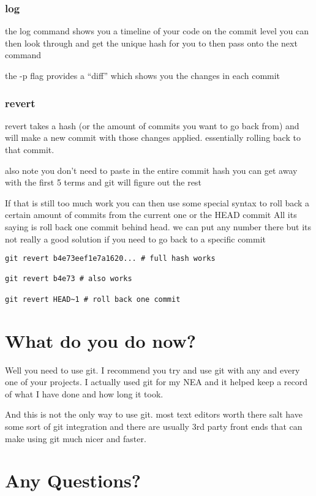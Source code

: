 \documentclass[a4paper]{article}
\begin{document}
\subsubsection*{log}
\label{sec:orgecca796}
\begin{notes}
the log command shows you a timeline of your code on the commit level you can
then look through and get the unique hash for you to then pass onto the next
command

the -p flag provides a ``diff'' which shows you the changes in each commit
\end{notes}
\subsubsection*{revert}
\label{sec:orgf1e085a}
\begin{notes}
revert takes a hash (or the amount of commits you want to go back from) and will
make a new commit with those changes applied. essentially rolling back to that
commit.

also note you don't need to paste in the entire commit hash you can get away
with the first 5 terms and git will figure out the rest

If that is still too much work you can then use some special syntax to roll back
a certain amount of commits from the current one or the HEAD commit
All its saying is roll back one commit behind head. we can put any number there
but its not really a good solution if you need to go back to a specific commit
\end{notes}

\begin{verbatim}
git revert b4e73eef1e7a1620... # full hash works

git revert b4e73 # also works

git revert HEAD~1 # roll back one commit
\end{verbatim}
\section*{What do you do now?}
\label{sec:orga63d8b9}
\begin{notes}
Well you need to use git. I recommend you try and use git with any and every one
of your projects. I actually used git for my NEA and it helped keep a record of
what I have done and how long it took.

And this is not the only way to use git. most text editors worth there salt have
some sort of git integration and there are usually 3rd party front ends that can
make using git much nicer and faster.
\end{notes}

\section*{Any Questions?}
\label{sec:org0d709e1}
\end{document}
